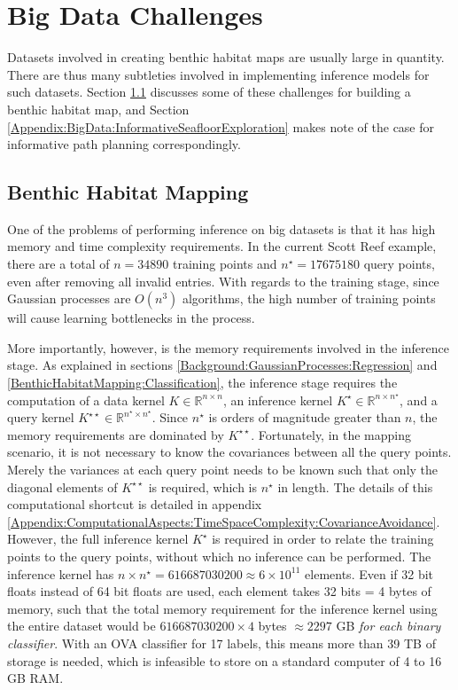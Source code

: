 \chapter{Big Data Challenges}
\label{Appendix:BigData}

	Datasets involved in creating benthic habitat maps are usually large in quantity. There are thus many subtleties involved in implementing inference models for such datasets. Section \ref{Appendix:BigData:BenthicHabitatMapping} discusses some of these challenges for building a benthic habitat map, and Section \ref{Appendix:BigData:InformativeSeafloorExploration} makes note of the case for informative path planning correspondingly.
	
	\section{Benthic Habitat Mapping}
	\label{Appendix:BigData:BenthicHabitatMapping}
	
		One of the problems of performing inference on big datasets is that it has high memory and time complexity requirements. In the current Scott Reef example, there are a total of $n = 34890$ training points and $n^{\star} = 17675180$ query points, even after removing all invalid entries. With regards to the training stage, since Gaussian processes are $O(n^{3})$ algorithms, the high number of training points will cause learning bottlenecks in the process.
		
		More importantly, however, is the memory requirements involved in the inference stage. As explained in sections \ref{Background:GaussianProcesses:Regression} and \ref{BenthicHabitatMapping:Classification}, the inference stage requires the computation of a data kernel $K \in \mathbb{R}^{n \times n}$, an inference kernel $K^{\star} \in \mathbb{R}^{n \times n^{\star}}$, and a query kernel $K^{\star \star} \in \mathbb{R}^{n^{\star} \times n^{\star}}$. Since $n^{\star}$ is orders of magnitude greater than $n$, the memory requirements are dominated by $K^{\star \star}$. Fortunately, in the mapping scenario, it is not necessary to know the covariances between all the query points. Merely the variances at each query point needs to be known such that only the diagonal elements of $K^{\star \star}$ is required, which is $n^{\star}$ in length. The details of this computational shortcut is detailed in appendix \ref{Appendix:ComputationalAspects:TimeSpaceComplexity:CovarianceAvoidance}. However, the full inference kernel $K^{\star}$ is required in order to relate the training points to the query points, without which no inference can be performed. The inference kernel has $n \times n^{\star} = 616687030200 \approx 6 \times 10^{11}$ elements. Even if 32 bit floats instead of 64 bit floats are used, each element takes 32 bits = 4 bytes of memory, such that the total memory requirement for the inference kernel using the entire dataset would be $616687030200 \times 4$ bytes $\approx 2297$ GB \textit{for each binary classifier}. With an OVA classifier for 17 labels, this means more than 39 TB of storage is needed, which is infeasible to store on a standard computer of 4 to 16 GB RAM.
		
